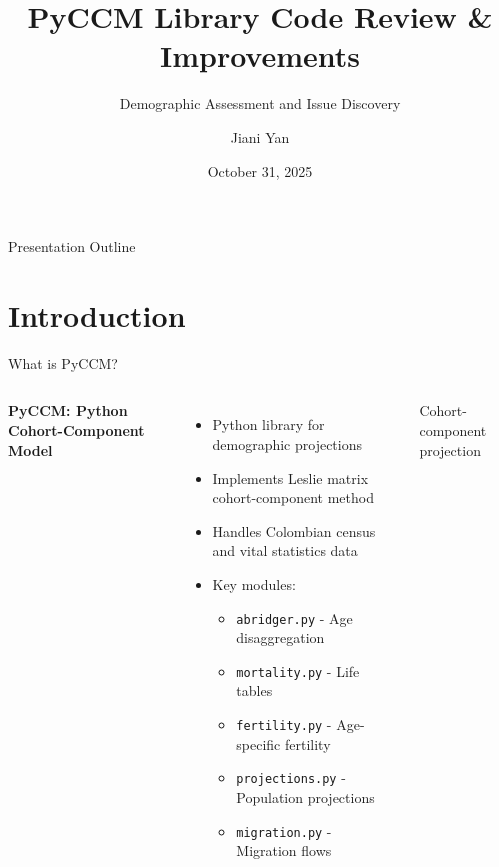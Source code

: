 \documentclass[aspectratio=169]{beamer}
\title[PyCCM Code Review]{PyCCM Library Code Review \& Improvements}
\subtitle{Demographic Assessment and Issue Discovery}
\author{Jiani Yan}
\institute{Demographic Research Methods}
\date{October 31, 2025}
\begin{document}
\begin{frame}
\titlepage
\end{frame}

\begin{frame}{Presentation Outline}
\tableofcontents
\end{frame}

\section{Introduction}

\begin{frame}{What is PyCCM?}
\begin{columns}
\textbf{PyCCM: Python Cohort-Component Model}
\begin{itemize}
    \item Python library for demographic projections
    \item Implements Leslie matrix cohort-component method
    \item Handles Colombian census and vital statistics data
    \item Key modules:
    \begin{itemize}
        \item \texttt{abridger.py} - Age disaggregation
        \item \texttt{mortality.py} - Life tables
        \item \texttt{fertility.py} - Age-specific fertility
        \item \texttt{projections.py} - Population projections
        \item \texttt{migration.py} - Migration flows
    \end{itemize}
\end{itemize}

\begin{center}
\end{center}
\vspace{0.2cm}
\small Cohort-component projection
\end{columns}
\end{frame}
\end{document}
